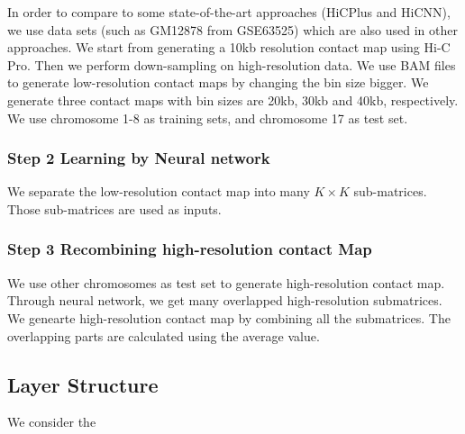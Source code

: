 \documentclass{article}
\begin{document}
In order to compare to some state-of-the-art approaches (HiCPlus and HiCNN), 
we use data sets (such as GM12878 from GSE63525) which are also used in other approaches. 
We start from generating a 10kb resolution contact map 
using Hi-C Pro. 
Then we perform down-sampling on high-resolution data. 
We use BAM files to generate low-resolution contact maps by changing the bin size bigger. 
We generate three contact maps with bin sizes are 20kb, 30kb and 40kb, respectively. 
We use chromosome 1-8 as training sets, and chromosome 17 as test set.

\subsubsection*{Step 2 Learning by Neural network}
We separate the low-resolution contact map into many $K \times K$ sub-matrices. 
Those sub-matrices are used as inputs.


\subsubsection*{Step 3 Recombining high-resolution contact Map}
We use other chromosomes as test set to generate high-resolution contact map. Through neural network, we get many overlapped high-resolution submatrices. We genearte high-resolution contact map by combining all the submatrices. The overlapping parts are calculated using the average value.

\subsection{Layer Structure}
We consider the 





 
\end{document}
